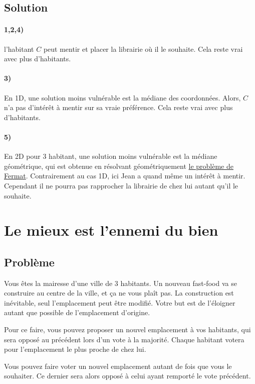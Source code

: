 \documentclass[a4paper,10pt,oneside]{article}
\begin{document}
\subsection{Solution}

\paragraph*{1,2,4)} 
l'habitant $C$ peut mentir et placer la librairie où il le souhaite. Cela reste vrai avec plus d'habitants.

\paragraph*{3)} 
En 1D, une solution moins vulnérable est la médiane des coordonnées. 
Alors, $C$ n'a pas d'intérêt à mentir sur sa vraie préférence. Cela reste vrai avec plus d'habitants.

\paragraph*{5)} 
En 2D pour 3 habitant, une solution moins vulnérable est la médiane géométrique, qui est obtenue en résolvant géométriquement \href{https://fr.wikipedia.org/wiki/Probl%C3%A8me_de_Weber}{le problème de Fermat}.
Contrairement au cas 1D, ici Jean a quand même un intérêt à mentir.
Cependant il ne pourra pas rapprocher la librairie de chez lui autant qu'il le souhaite.


\section{Le mieux est l'ennemi du bien}

\subsection{Problème}

Vous êtes la mairesse d'une ville de 3 habitants.
Un nouveau fast-food va se construire au centre de la ville, et ça ne vous plaît pas.
La construction est inévitable, seul l'emplacement peut être modifié.
Votre but est de l'éloigner autant que possible de l'emplacement d'origine.

Pour ce faire, vous pouvez proposer un nouvel emplacement à vos habitants, qui sera opposé au précédent lors d'un vote à la majorité.
Chaque habitant votera pour l'emplacement le plus proche de chez lui.

Vous pouvez faire voter un nouvel emplacement autant de fois que vous le souhaiter.
Ce dernier sera alors opposé à celui ayant remporté le vote précédent.
\end{document}
